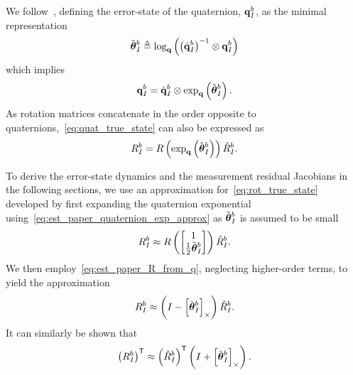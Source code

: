 We follow~\cite{koch2017relative}, defining the error-state of the quaternion,
$\boldsymbol{\mathrm{q}}_I^b$,
as the minimal representation
\begin{equation}
  \tilde{\vect{\theta}}_I^b \triangleq \log_{\q} \left( \left( \hat{\q}_I^b \right)^{-1}
  \otimes \q_I^b \right)
  \label{eq:quat_error_state}
\end{equation}
which implies
\begin{equation}
  \q_I^b  = \hat{\q}_I^b \otimes \exp_{\q} \left( \tilde{\vect{\theta}}_I^b
  \right).
  \label{eq:quat_true_state}
\end{equation}
As rotation matrices concatenate in the order opposite to
quaternions,~\eqref{eq:quat_true_state} can also be expressed as
\begin{equation}
  R_I^b  = R \left( \exp_{\q} \left( \tilde{\vect{\theta}}_I^b \right) \right)
  \hat{R}_I^b.
  \label{eq:rot_true_state}
\end{equation}

To derive the error-state dynamics and the measurement residual Jacobians in the
following sections, we
use an approximation for~\eqref{eq:rot_true_state} developed by first expanding
the
quaternion exponential using~\eqref{eq:est_paper_quaternion_exp_approx} as
$\tilde{\boldsymbol{\mathrm{\theta}}}_I^b$ is assumed to be small
\begin{equation}
  R_I^b  \approx R \left( \begin{bmatrix}
      1 \\
    \frac{1}{2} \tilde{\boldsymbol{\mathrm{\theta}}}_I^b
  \end{bmatrix}\right)
  \hat{R}_I^b.
\end{equation}
We then employ~\eqref{eq:est_paper_R_from_q}, neglecting higher-order terms, to
yield the approximation
\begin{equation}
  R_I^b  \approx 
  \left( I - \skewmat{\tilde{\vect{\theta}}_I^b} \right)
  \hat{R}_I^b.
  \label{eq:est_paper_Rapprox}
\end{equation}
It can similarly be shown that
\begin{equation}
  \left( R_I^b \right)^\transpose  \approx 
  \left( \hat{R}_I^b \right)^\transpose
  \left( I + \skewmat{\tilde{\vect{\theta}}_I^b} \right).
  \label{eq:est_paper_RTapprox}
\end{equation}



